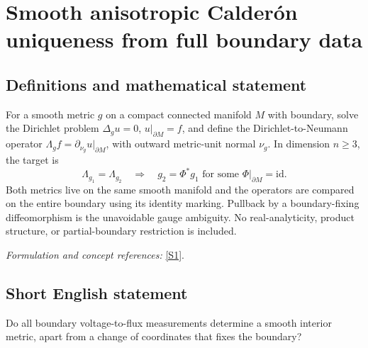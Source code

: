 \documentclass[11pt,a4paper]{article}
\newcommand{\sref}[2]{\hyperlink{source:#1:#2}{[S#2]}}
\newif\ifshowcatalogue
\newcommand{\cataloguescope}[1]{\ifshowcatalogue
 \paragraph{Exact scope in the supplied catalogue.}
 \begin{quote}\small #1\end{quote}\fi}
\numberwithin{equation}{section}
\begin{document}
\setcounter{section}{175}
\clearpage
\section{\texorpdfstring{Smooth anisotropic Calderón uniqueness from full boundary data}{Smooth anisotropic Calderón uniqueness from full boundary data}}\label{176}
\subsection{Definitions and mathematical statement}
For a smooth metric $g$ on a compact connected manifold $M$ with boundary, solve the Dirichlet problem $\Delta_g u=0$, $u|_{\partial M}=f$, and define the Dirichlet-to-Neumann operator
$\Lambda_g f=\partial_{\nu_g}u|_{\partial M}$, with outward metric-unit normal $\nu_g$. In dimension $n\ge3$, the target is
\[
 \Lambda_{g_1}=\Lambda_{g_2}\quad\Longrightarrow\quad
 g_2=\Phi^*g_1\text{ for some }\Phi|_{\partial M}=\mathrm{id}.
\]
Both metrics live on the same smooth manifold and the operators are compared on the entire boundary using its identity marking. Pullback by a boundary-fixing diffeomorphism is the unavoidable gauge ambiguity. No real-analyticity, product structure, or partial-boundary restriction is included.
\par\smallskip\textit{Formulation and concept references:} \sref{176}{1}.
\cataloguescope{For every compact connected smooth manifold M of dimension n>=3 with smooth nonempty boundary and every pair of smooth Riemannian metrics g1,g2 on that same M, let Lambda\_gj f be the outward metric-unit normal derivative of the unique solution of Delta\_gj u=0 with u|boundary=f. If Lambda\_g1=Lambda\_g2 as operators C-infinity(boundary M) to C-infinity(boundary M), compared under the identity marking on the whole boundary, must there be a smooth diffeomorphism Phi:M->M fixing the boundary pointwise with g2=Phi\textasciicircum{}*g1?}
\subsection{Short English statement}
Do all boundary voltage-to-flux measurements determine a smooth interior metric, apart from a change of coordinates that fixes the boundary?
\end{document}
